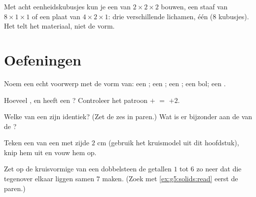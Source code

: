 \begin{example}\label{ex:g5:solids:rearrange}
Met acht eenheidskubusjes kun je een  van $2 \times 2 \times 2$ bouwen,
een staaf van $8 \times 1 \times 1$ of een plaat van $4 \times 2 \times 1$:
drie verschillende lichamen, één  ($8$ kubusjes). Het  telt het
materiaal, niet de vorm.
\end{example}

\section{Oefeningen}

\begin{exercise}[$\star$]\label{exo:g5:solids:1}
Noem een echt voorwerp met de vorm van: een ; een ; een ; een
bol; een .
\end{exercise}

\begin{exercise}[$\star$]\label{exo:g5:solids:2}
Hoeveel ,  en  heeft een ? Controleer het
patroon  $+$  $=$  $+ 2$.
\end{exercise}

\begin{exercise}[$\star$]\label{exo:g5:solids:3}
Welke  van een  zijn identiek? (Zet de zes  in
paren.) Wat is er bijzonder aan de  van de ?
\end{exercise}

\begin{exercise}[$\star$]\label{exo:g5:solids:4}
Teken een  van een  met zijde $2$ cm (gebruik het kruismodel uit
dit hoofdstuk), knip hem uit en vouw hem op.
\end{exercise}

\begin{exercise}[$\star$]\label{exo:g5:solids:5}
Zet op de kruisvormige  van een dobbelsteen de getallen $1$ tot $6$ zo
neer dat  die tegenover elkaar liggen samen $7$ maken. (Zoek met
\cref{ex:g5:solids:read} eerst de paren.)
\end{exercise}

